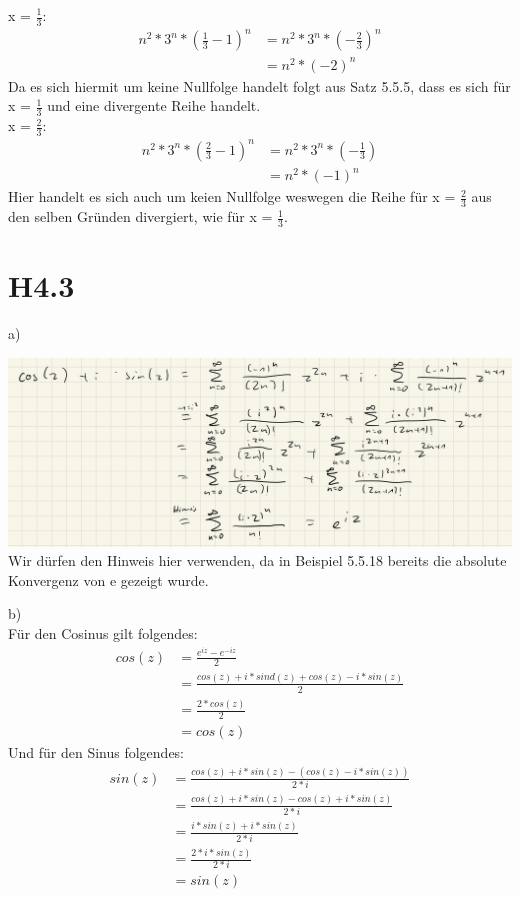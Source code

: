 \documentclass{article}
\begin{document}
\smallskip
x = $\frac{1}{3}$: 
\begin{align*}
    n^2 * 3^n * (\frac{1}{3} - 1)^n & = n^2 * 3^n * (- \frac{2}{3})^n \\ 
                                    & = n^2 * (-2)^n
\end{align*}
Da es sich hiermit um keine Nullfolge handelt folgt aus Satz 5.5.5, dass es sich für x = $\frac{1}{3}$ und eine divergente Reihe handelt. \\
\smallskip
x = $\frac{2}{3}$:
\begin{align*}
    n^2 * 3^n * (\frac{2}{3} - 1)^n & = n^2 * 3^n * (- \frac{1}{3}) \\ 
                                & = n^2 * (-1)^n
\end{align*}
Hier handelt es sich auch um keien Nullfolge weswegen die Reihe für x = $\frac{2}{3}$ aus den selben Gründen divergiert, 
wie für x = $\frac{1}{3}$.

\newpage
\section{H4.3}
\noindent a) \\ 
\bigskip

\includegraphics[scale=0.225]{ h4_3a } \\ 
Wir dürfen den Hinweis hier verwenden, da in Beispiel 5.5.18 bereits die absolute Konvergenz von e gezeigt wurde.

\bigskip
\noindent b) \\ 
Für den Cosinus gilt folgendes: 
\begin{align*}
    cos(z) & = \frac{e^{iz} - e^{-iz}}{2} \\
           & = \frac{cos(z) + i * sind(z) + cos(z) - i * sin(z)}{2} \\ 
           & = \frac{2 * cos(z)}{2} \\ 
           & = cos(z)
\end{align*}
\smallskip
Und für den Sinus folgendes:
\begin{align*}
    sin(z) & = \frac{cos(z) + i * sin(z) - (cos(z) - i * sin(z))}{2 * i} \\ 
           & = \frac{cos(z) + i * sin(z) - cos(z) + i * sin(z)}{2 * i} \\ 
           & = \frac{i * sin(z) + i * sin(z)}{2 * i} \\ 
           & = \frac{2 * i * sin(z)}{2 * i} \\ 
           & = sin(z)
\end{align*}
\end{document}
